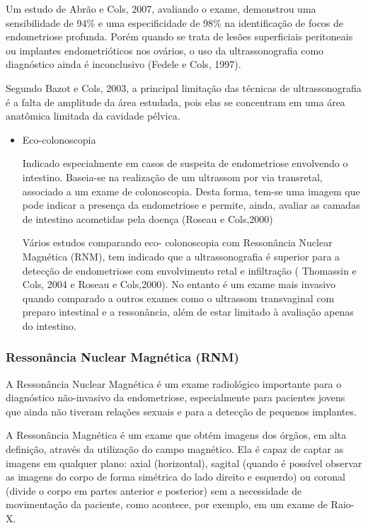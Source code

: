 \documentclass[12pt]{article} %
\begin{document}
Um estudo de Abrão e Cols, 2007, avaliando o exame, demonstrou uma sensibilidade de 94\% e uma especificidade de 98\% na identificação de focos de endometriose profunda. Porém quando se trata de lesões superficiais peritoneais ou implantes endometrióticos nos ovários, o uso da ultrassonografia como diagnóstico ainda é inconclusivo (Fedele e Cols, 1997).

Segundo Bazot e Cols, 2003, a principal limitação das técnicas de ultrassonografia é a falta de amplitude da área estudada, pois elas se concentram em uma área anatômica limitada da cavidade pélvica.

\begin{itemize}
\item Eco-colonoscopia

Indicado especialmente em casos de suspeita de endometriose envolvendo o intestino. Baseia-se na realização de um ultrassom por via transretal, associado a um exame de colonoscopia. Desta forma, tem-se uma imagem que pode indicar a presença da endometriose e permite, ainda, avaliar as camadas de intestino acometidas pela doença (Roseau e Cols,2000)

Vários estudos comparando eco- colonoscopia com Ressonância Nuclear Magnética  (RNM), tem
indicado que a ultrassonografia é superior para a detecção de endometriose com envolvimento retal e
infiltração ( Thomassin e Cols, 2004 e Roseau e Cols,2000). No entanto é um exame mais invasivo quando comparado a outros exames como o ultrassom transvaginal com preparo intestinal e a ressonância, além de estar limitado à avaliação apenas do intestino.
\end{itemize}


\subsubsection{Ressonância Nuclear Magnética (RNM)}


A Ressonância Nuclear Magnética é um exame radiológico importante para o diagnóstico não-invasivo da endometriose, especialmente para pacientes jovens que ainda não tiveram relações sexuais e para a detecção de pequenos implantes.

A Ressonância Magnética é um exame que obtém imagens dos órgãos, em alta definição, através da utilização do campo magnético. Ela é capaz de captar as imagens em qualquer plano: axial (horizontal), sagital (quando é possível observar as imagens do corpo de forma simétrica do lado direito e esquerdo) ou coronal (divide o corpo em partes anterior e posterior) sem a necessidade de movimentação da paciente, como acontece, por exemplo, em um exame de Raio-X.
\end{document}
